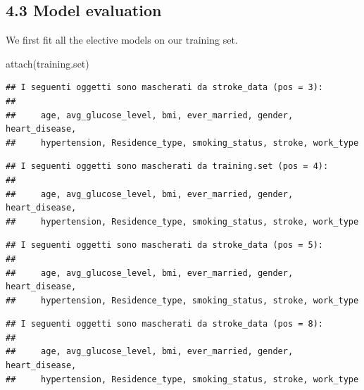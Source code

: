 \documentclass[
]{article}
\newenvironment{Shaded}{\begin{snugshade}}{\end{snugshade}}
\newcommand{\FunctionTok}[1]{\textcolor[rgb]{0.00,0.00,0.00}{#1}}
\newcommand{\NormalTok}[1]{#1}
\begin{document}
\hypertarget{model-evaluation}{%
\subsection{4.3 Model evaluation}\label{model-evaluation}}

We first fit all the elective models on our training set.

\begin{Shaded}
\begin{Highlighting}[]
\FunctionTok{attach}\NormalTok{(training.set)}
\end{Highlighting}
\end{Shaded}

\begin{verbatim}
## I seguenti oggetti sono mascherati da stroke_data (pos = 3):
## 
##     age, avg_glucose_level, bmi, ever_married, gender, heart_disease,
##     hypertension, Residence_type, smoking_status, stroke, work_type
\end{verbatim}

\begin{verbatim}
## I seguenti oggetti sono mascherati da training.set (pos = 4):
## 
##     age, avg_glucose_level, bmi, ever_married, gender, heart_disease,
##     hypertension, Residence_type, smoking_status, stroke, work_type
\end{verbatim}

\begin{verbatim}
## I seguenti oggetti sono mascherati da stroke_data (pos = 5):
## 
##     age, avg_glucose_level, bmi, ever_married, gender, heart_disease,
##     hypertension, Residence_type, smoking_status, stroke, work_type
\end{verbatim}

\begin{verbatim}
## I seguenti oggetti sono mascherati da stroke_data (pos = 8):
## 
##     age, avg_glucose_level, bmi, ever_married, gender, heart_disease,
##     hypertension, Residence_type, smoking_status, stroke, work_type
\end{verbatim}
\end{document}
